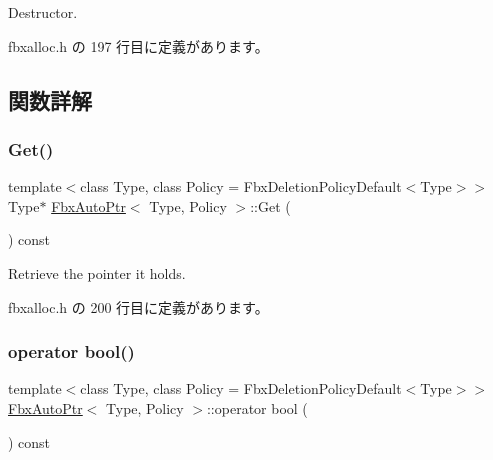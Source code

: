 Destructor. 



 fbxalloc.\+h の 197 行目に定義があります。



\subsection{関数詳解}
\mbox{\label{class_fbx_auto_ptr_ae7006aca39929990a12c7c99af5d3ef7}} 
\subsubsection{\texorpdfstring{Get()}{Get()}}
{\footnotesize\ttfamily template$<$class Type, class Policy = Fbx\+Deletion\+Policy\+Default$<$\+Type$>$$>$ \\
Type$\ast$ \hyperlink{class_fbx_auto_ptr}{Fbx\+Auto\+Ptr}$<$ Type, Policy $>$\+::Get (\begin{DoxyParamCaption}{ }\end{DoxyParamCaption}) const\hspace{0.3cm}{\ttfamily [inline]}}



Retrieve the pointer it holds. 



 fbxalloc.\+h の 200 行目に定義があります。

\mbox{\label{class_fbx_auto_ptr_ae92a5d1428b0ce74491aab76f8535b4c}} 
\subsubsection{\texorpdfstring{operator bool()}{operator bool()}}
{\footnotesize\ttfamily template$<$class Type, class Policy = Fbx\+Deletion\+Policy\+Default$<$\+Type$>$$>$ \\
\hyperlink{class_fbx_auto_ptr}{Fbx\+Auto\+Ptr}$<$ Type, Policy $>$\+::operator bool (\begin{DoxyParamCaption}{ }\end{DoxyParamCaption}) const\hspace{0.3cm}{\ttfamily [inline]}}



